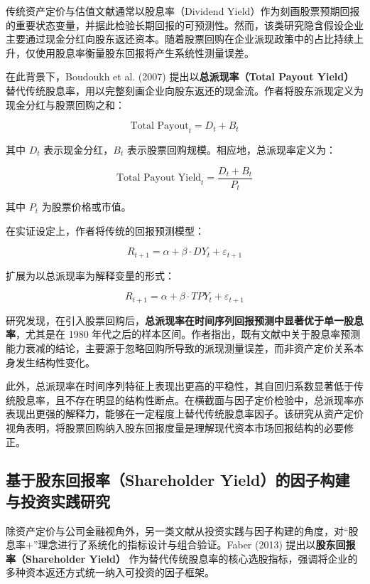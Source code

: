 \documentclass[a4paper,10pt]{article}
\begin{document}
传统资产定价与估值文献通常以股息率（Dividend Yield）作为刻画股票预期回报的重要状态变量，并据此检验长期回报的可预测性。然而，该类研究隐含假设企业主要通过现金分红向股东返还资本。随着股票回购在企业派现政策中的占比持续上升，仅使用股息率衡量股东回报将产生系统性测量误差。

在此背景下，Boudoukh et al. (2007) 提出以\textbf{总派现率（Total Payout Yield）}替代传统股息率，用以完整刻画企业向股东返还的现金流。作者将股东派现定义为现金分红与股票回购之和：

\begin{equation}
    \text{Total Payout}_t = D_t + B_t
\end{equation}

其中 $D_t$ 表示现金分红，$B_t$ 表示股票回购规模。相应地，总派现率定义为：

\begin{equation}
    \text{Total Payout Yield}_t = \frac{D_t + B_t}{P_t}
\end{equation}

其中 $P_t$ 为股票价格或市值。

在实证设定上，作者将传统的回报预测模型：

\begin{equation}
    R_{t+1} = \alpha + \beta \cdot DY_t + \varepsilon_{t+1}
\end{equation}

扩展为以总派现率为解释变量的形式：

\begin{equation}
    R_{t+1} = \alpha + \beta \cdot TPY_t + \varepsilon_{t+1}
\end{equation}

研究发现，在引入股票回购后，\textbf{总派现率在时间序列回报预测中显著优于单一股息率}，尤其是在 1980 年代之后的样本区间。作者指出，既有文献中关于股息率预测能力衰减的结论，主要源于忽略回购所导致的派现测量误差，而非资产定价关系本身发生结构性变化。

此外，总派现率在时间序列特征上表现出更高的平稳性，其自回归系数显著低于传统股息率，且不存在明显的结构性断点。在横截面与因子定价检验中，总派现率亦表现出更强的解释力，能够在一定程度上替代传统股息率因子。该研究从资产定价视角表明，将股票回购纳入股东回报度量是理解现代资本市场回报结构的必要修正。

\subsection{基于股东回报率（Shareholder Yield）的因子构建与投资实践研究}

除资产定价与公司金融视角外，另一类文献从投资实践与因子构建的角度，对“股息率+”理念进行了系统化的指标设计与组合验证。Faber (2013) 提出以\textbf{股东回报率（Shareholder Yield）} 作为替代传统股息率的核心选股指标，强调将企业的多种资本返还方式统一纳入可投资的因子框架。
\end{document}
